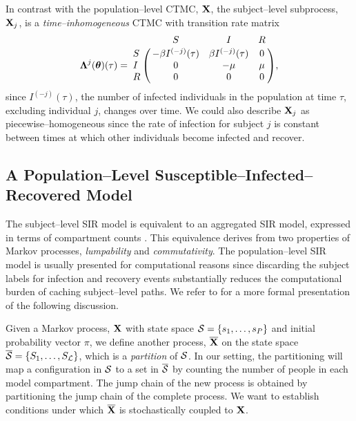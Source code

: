 In contrast with the population--level CTMC, $ \mathbf{X} $, the subject--level subprocess, $ \mathbf{X}_j $, is a \textit{time--inhomogeneous} CTMC with transition rate matrix
\begin{equation} 
\label{eqn:sir_subj_rate_mtx}
\bLambda^{j}(\btheta)(\tau) = \bordermatrix{ & S & I & R \cr
	S & -\beta I^{(-j)}(\tau) & \beta I^{(-j)}(\tau) & 0 \cr 
	I & 0 & -\mu & \mu \cr
	R & 0 & 0 & 0 },
\end{equation}
since $ I^{(-j)}(\tau) $, the number of infected individuals in the population at time $ \tau $, excluding individual $ j $, changes over time. We could also describe $ \mathbf{X}_j $ as piecewise--homogeneous since the rate of infection for subject $ j $ is constant between times at which other individuals become infected and recover. 

\subsection{A Population--Level Susceptible--Infected--Recovered Model}
\label{subsec:sir_population_mod}
The subject--level SIR model is equivalent to an aggregated SIR model, expressed in terms of compartment counts \cite{allen2008introduction, andersson2000stochastic}. This equivalence derives from two properties of Markov processes, \textit{lumpability} and \textit{commutativity}. The population--level SIR model is usually presented for computational reasons since discarding the subject labels for infection and recovery events substantially reduces the computational burden of caching subject--level paths. We refer to \cite{tian2006lumpability} for a more formal presentation of the following discussion. 

Given a Markov process, $ \mathbf{X} $ with state space $ \mathcal{S} = \lbrace s_1,\dots,s_P\rbrace $ and initial probability vector $ \pi $, we define another process, $ \overline{\mathbf{X}} $ on the state space $ \overline{\mathcal{S}} = \lbrace S_1,\dots,S_\mathcal{L}\rbrace $, which is a \textit{partition} of $ \mathcal{S} $. In our setting, the partitioning will map a configuration in $ \mathcal{S} $ to a set in $ \overline{\mathcal{S}} $ by counting the number of people in each model compartment. The jump chain of the new process is obtained by partitioning the jump chain of the complete process. We want to establish conditions under which $ \overline{\mathbf{X}} $ is stochastically coupled to $ \mathbf{X} $. 

